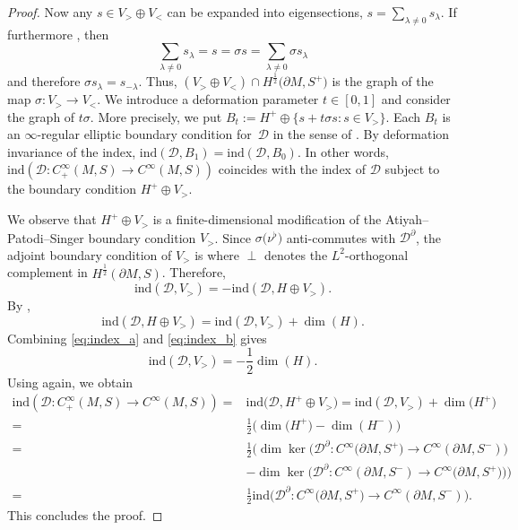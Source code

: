 \documentclass[pdftex]{sigma}
\numberwithin{equation}{section}
\begin{document}
\begin{proof}
Now any $s\in V_>\oplus V_<$ can be expanded into eigensections, $s=\sum_{\lambda\neq0}s_\lambda$.
If furthermore , then
\[
\sum_{\lambda\neq0}s_\lambda
=
s
=
\sigma s
=
\sum_{\lambda\neq0}\sigma s_\lambda
\]
and therefore $
\sigma s_\lambda = s_{-\lambda}$. Thus, $(V_>\oplus V_<) \cap H^{\frac{1}{2}}\big(\partial M,S^+\big)$ is the graph of the map $\sigma\colon V_> \to V_<$.
We introduce a deformation parameter $t\in [0,1]$ and consider the graph of $t\sigma$.
More precisely, we put $B_t := H^+ \oplus \{s+t\sigma s \colon s \in V_>\}$.
Each $B_t$ is an $\infty$-regular elliptic boundary condition for~$\mathcal{D}$ in the sense of \cite{Baer-Ballmann}.
By deformation invariance of the index, $\mathrm{ind}(\mathcal{D},B_1) = \mathrm{ind}(\mathcal{D},B_0)$. In other words, $\mathrm{ind}(\mathcal{D}\colon C^\infty_+(M,S)\to C^\infty(M,S))$ coincides with the index of $\mathcal{D}$ subject to the boundary condition $H^+\oplus V_>$.

We observe that $H^+\oplus V_>$ is a finite-dimensional modification of the Atiyah--Patodi--Singer boundary condition $V_>$.
Since $\sigma\big(\nu^\flat\big)$ anti-commutes with $\mathcal{D}^\partial$, the adjoint boundary condition of $V_>$ is  where $\perp$ denotes the $L^2$-orthogonal complement in $H^{\frac{1}{2}}(\partial M,S)$. Therefore,
\begin{equation} \label{eq:index_a}
\mathrm{ind}(\mathcal{D},V_>) = -\mathrm{ind}(\mathcal{D},H\oplus V_>).
\end{equation}
By \cite[Corollary~8.8]{Baer-Ballmann},
\begin{equation} \label{eq:index_b}
\mathrm{ind}(\mathcal{D},H\oplus V_>) = \mathrm{ind}(\mathcal{D},V_>)+\dim(H).
\end{equation}
Combining \eqref{eq:index_a} and \eqref{eq:index_b} gives
\[
\mathrm{ind}(\mathcal{D},V_>)
=
-\frac{1}{2} \dim(H).
\]
Using \cite[Corollary~8.8]{Baer-Ballmann} again, we obtain
\begin{align*}
\mathrm{ind}(\mathcal{D}\colon C^\infty_+(M,S)\to C^\infty(M,S))
={}&
\mathrm{ind}\big(\mathcal{D},H^+\oplus V_>\big) =
\mathrm{ind}(\mathcal{D},V_>)+\dim\big(H^+\big) \\
={}&
\frac{1}{2} \big(\dim\big(H^+\big)-\dim(H^-)\big) \\
={}&
\frac{1}{2} \big(\dim\ker\big(\mathcal{D}^\partial\colon C^\infty\big(\partial M,S^+\big)\to C^\infty(\partial M,S^-)\big) \\
& -\dim\ker\big(\mathcal{D}^\partial\colon C^\infty(\partial M,S^-)\to C^\infty\big(\partial M,S^+\big)\big)\big) \\
={}&
\frac{1}{2} \mathrm{ind}\big(\mathcal{D}^\partial\colon C^\infty\big(\partial M,S^+\big)\to C^\infty(\partial M,S^-)\big) .
\end{align*}
This concludes the proof.
\end{proof}
\end{document}
